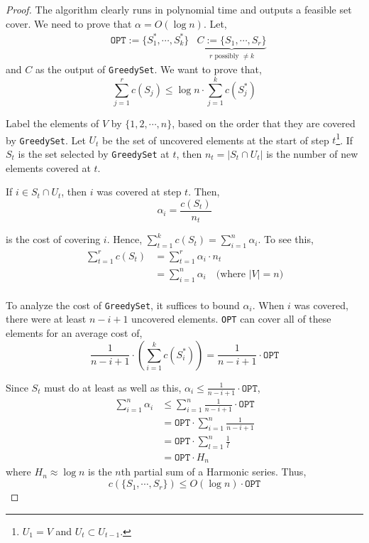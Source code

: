\begin{proof}
	The algorithm clearly runs in polynomial time and outputs a feasible set cover. We need to prove that $\alpha = O(\log n)$. Let,
	\begin{align*}
		&\texttt{OPT} := \{S^*_1, \cdots, S_k^*\}
		&\underbrace{C := \{S_1, \cdots, S_r\}}_{r \text{ possibly } \neq k}
	\end{align*}
	\noindent and $C$ as the output of \texttt{GreedySet}. We want to prove that,
	\[\sum_{j=1}^r c(S_j) \leq \log n \cdot \sum_{j=1}^k c(S_j^*)\]

	Label the elements of $V$ by $\{1, 2, \cdots, n\}$, based on the order that they are covered by \texttt{GreedySet}. Let $U_t$ be the set of uncovered elements at the start of step $t$\footnote{$U_1 = V$ and $U_t \subset U_{t-1}$.}. If $S_t$ is the set selected by \texttt{GreedySet} at $t$, then $n_t = |S_t \cap U_t|$ is the number of new elements covered at $t$.

	\noindent If $i \in S_t \cap U_t$, then $i$ was covered at step $t$. Then,
	\[\alpha_i = \frac{c(S_t)}{n_t}\]

	\noindent is the cost of covering $i$. Hence, $\sum_{t=1}^{k} c(S_{t})=\sum_{i=1}^{n} \alpha_{i}$. To see this,
	\begin{align*}
		\sum_{t=1}^{r} c(S_{t}) &= \sum_{t=1}^{r} \alpha_i \cdot n_t \\
								&= \sum_{i=1}^{n}  \alpha_i \quad \text{(where $|V| = n$)}\\
	\end{align*}

	To analyze the cost of \texttt{GreedySet}, it suffices to bound $\alpha_i$. When $i$ was covered, there were at least $n - i + 1$ uncovered elements. \texttt{OPT} can cover all of these elements for an average cost of,
	\[\frac{1}{n-i+1} \cdot \left(\sum_{i=1}^{k} c(S_i^*)\right)=\frac{1}{n-i+1} \cdot \texttt{OPT}\]

	Since $S_t$ must do at least as well as this, $\alpha_i \leq \frac{1}{n-i+1} \cdot \texttt{OPT}$,
	\begin{align*}
		\sum_{i=1}^{n}  \alpha_i &\leq \sum_{i=1}^{n} \frac{1}{n-i+1} \cdot \texttt{OPT} \\
								 &= \texttt{OPT} \cdot \sum_{i=1}^{n} \frac{1}{n-i+1} \\
								 &= \texttt{OPT} \cdot \sum_{l=1}^n \frac{1}{l} \\
								 &= \texttt{OPT} \cdot H_n
	\end{align*}
	\noindent where $H_n \approx \log n$ is the $n$th partial sum of a Harmonic series. Thus,
	\[c(\{S_1, \cdots, S_r\}) \leq O(\log n) \cdot \texttt{OPT}\]
\end{proof}

